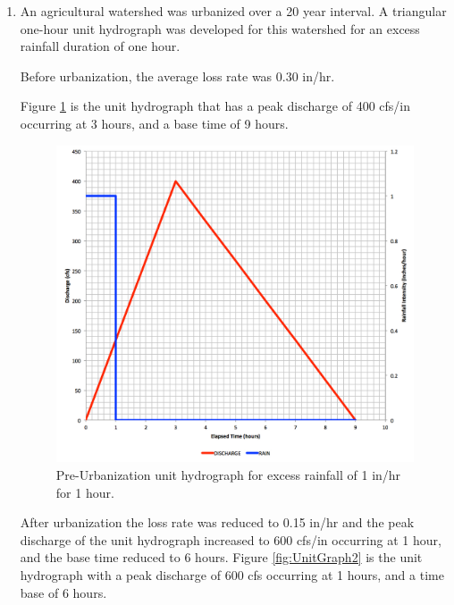 \documentclass[12pt]{article}
\begin{document}
\begin{enumerate}
\clearpage


\item An agricultural watershed was urbanized over a 20 year interval.  A triangular one-hour unit hydrograph was developed for this watershed for an excess rainfall duration of one hour.  

Before urbanization, the average loss rate was 0.30 in/hr.  

Figure \ref{fig:UnitGraph1} is the unit hydrograph that has a peak discharge of 400 cfs/in occurring at 3 hours, and a base time of 9 hours.
\begin{figure}[h!] %
   \centering
   \includegraphics[width=5in]{UnitGraph1.jpg} 
   \caption{Pre-Urbanization unit hydrograph for excess rainfall of 1 in/hr for 1 hour.}
   \label{fig:UnitGraph1}
\end{figure}
\clearpage

After urbanization the loss rate was reduced to 0.15 in/hr and the peak discharge of the unit hydrograph increased to 600 cfs/in occurring at 1 hour, and the base time reduced to 6 hours.    Figure \ref{fig:UnitGraph2} is the unit hydrograph with a peak discharge of 600 cfs occurring at 1 hours, and a time base of 6 hours.


\end{enumerate}
\end{document}
